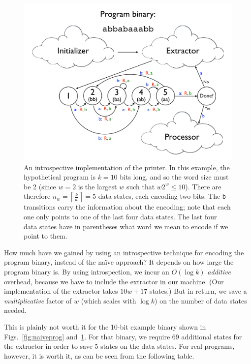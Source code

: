 \documentclass[11pt]{article}
\begin{document}
\begin{figure}
\begin{center}
\includegraphics[scale=0.42]{figs/introspectprog.png}
\caption{An introspective implementation of the printer. In this example, the hypothetical program is $k=10$ bits long, and so the word size must be 2 (since $w=2$ is the largest $w$ such that $w2^w \le 10$). There are therefore $n_w = \left \lceil{\frac{k}{w}}\right \rceil = 5$ data states, each encoding two bits. The \texttt{b} transitions carry the information about the encoding; note that each one only points to one of the last four data states. The last four data states have in parentheses what word we mean to encode if we point to them. \label{fig:introspectprog}}
\end{center}
\end{figure}

How much have we gained by using an introspective technique for encoding the program binary, instead of the na\"ive approach? It depends on how large the program binary is. By using introspection, we incur an $O(\log k)$ \emph{additive} overhead, because we have to include the extractor in our machine. (Our implementation of the extractor takes $10w + 17$ states.) But in return, we save a \emph{multiplicative} factor of $w$ (which scales with $\log k$) on the number of data states needed. 

This is plainly not worth it for the 10-bit example binary shown in Figs.~\ref{fig:naiveprog} and~\ref{fig:introspectprog}. For that binary, we require 69 additional states for the extractor in order to save 5 states on the data states. For real programs, however, it is worth it, as can be seen from the following table.
\end{document}
